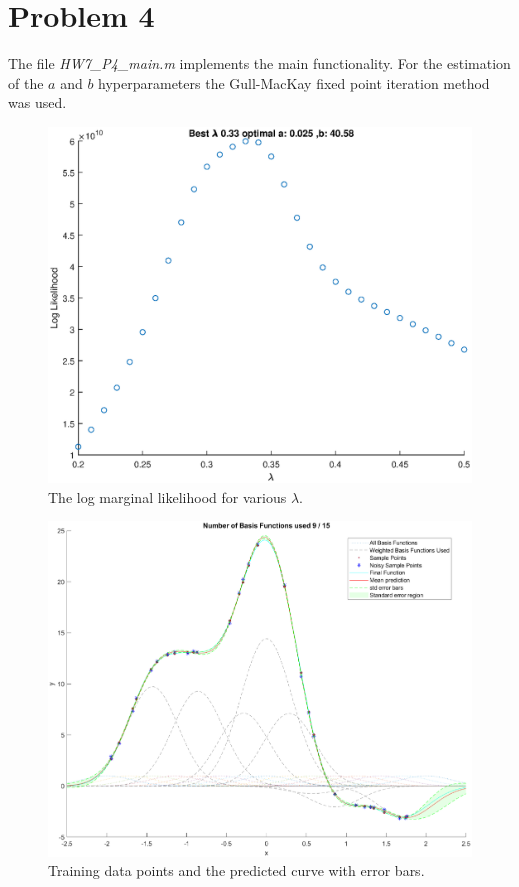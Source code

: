 \documentclass{article}
\begin{document}
\section*{Problem 4}

The file \textit{HW7\_P4\_main.m} implements the main functionality.
For the estimation of the $a$ and $b$ hyperparameters the Gull-MacKay fixed point iteration method was used.


\begin{figure}[H]
    \centering
    \includegraphics[width=\textwidth]{log_like_lambda.eps}     
    \caption{The log marginal likelihood for various $\lambda$.}
\end{figure}



\begin{figure}[H]
    \centering
    \includegraphics[width=\textwidth]{points_and_curves.eps}     
    \caption{Training data points and the predicted
curve with error bars.}
\end{figure}
\end{document}
